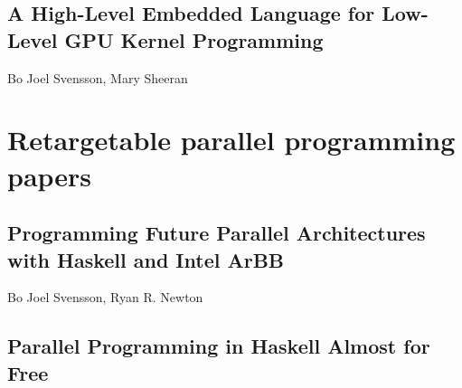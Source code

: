 \documentclass[a4paper]{book}
\newcommand{\paperHL}{A High-Level Embedded Language for Low-Level GPU Kernel Programming}
\newcommand{\paperARBB}{Programming Future Parallel Architectures with Haskell and Intel ArBB}
\newcommand{\paperEMBARBB}{Parallel Programming in Haskell Almost for Free}
\begin{document}



% 
\cleardoublepage 


\section{\paperHL}
\label{sec:paperHL}

\begin{center} 
Bo Joel Svensson, Mary Sheeran
\end{center}






% 

\chapter{Retargetable parallel programming papers}
\label{chap:ArBB}
% 
\cleardoublepage 


\section{\paperARBB}
\label{sec:paperARBB}

\begin{center} 
Bo Joel Svensson, Ryan R. Newton
\end{center}




% 
\cleardoublepage 


\section{\paperEMBARBB}
\label{sec:paperEMBARBB}
\end{document}
